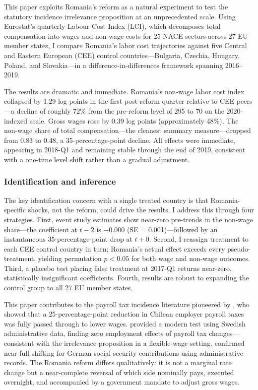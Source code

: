 \documentclass[12pt]{article}
\begin{document}
This paper exploits Romania's reform as a natural experiment to test the statutory incidence irrelevance proposition at an unprecedented scale. Using Eurostat's quarterly Labour Cost Index (LCI), which decomposes total compensation into wages and non-wage costs for 25 NACE sectors across 27 EU member states, I compare Romania's labor cost trajectories against five Central and Eastern European (CEE) control countries---Bulgaria, Czechia, Hungary, Poland, and Slovakia---in a difference-in-differences framework spanning 2016--2019.

The results are dramatic and immediate. Romania's non-wage labor cost index collapsed by 1.29 log points in the first post-reform quarter relative to CEE peers---a decline of roughly 72\% from the pre-reform level of 295 to 70 on the 2020-indexed scale. Gross wages rose by 0.39 log points (approximately 48\%). The non-wage share of total compensation---the cleanest summary measure---dropped from 0.83 to 0.48, a 35-percentage-point decline. All effects were immediate, appearing in 2018-Q1 and remaining stable through the end of 2019, consistent with a one-time level shift rather than a gradual adjustment.

\subsubsection*{Identification and inference} The key identification concern with a single treated country is that Romania-specific shocks, not the reform, could drive the results. I address this through four strategies. First, event study estimates show near-zero pre-trends in the non-wage share---the coefficient at $t-2$ is $-0.000$ (SE = 0.001)---followed by an instantaneous 35-percentage-point drop at $t+0$. Second, I reassign treatment to each CEE control country in turn; Romania's actual effect exceeds every pseudo-treatment, yielding permutation $p < 0.05$ for both wage and non-wage outcomes. Third, a placebo test placing false treatment at 2017-Q1 returns near-zero, statistically insignificant coefficients. Fourth, results are robust to expanding the control group to all 27 EU member states.

This paper contributes to the payroll tax incidence literature pioneered by \citet{gruber1997incidence}, who showed that a 25-percentage-point reduction in Chilean employer payroll taxes was fully passed through to lower wages. \citet{saez2019payroll} provided a modern test using Swedish administrative data, finding zero employment effects of payroll tax changes---consistent with the irrelevance proposition in a flexible-wage setting. \citet{anderson2013incidence} confirmed near-full shifting for German social security contributions using administrative records. The Romania reform differs qualitatively: it is not a marginal rate change but a near-complete reversal of which side nominally pays, executed overnight, and accompanied by a government mandate to adjust gross wages.
\end{document}
